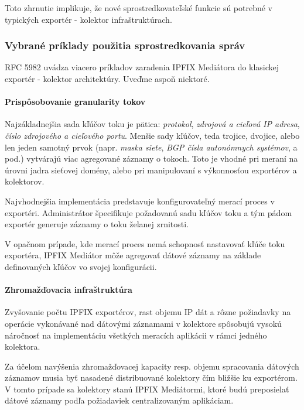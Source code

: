 Toto zhrnutie implikuje, že nové sprostredkovateľské funkcie sú potrebné v typických exportér - kolektor
infraštruktúrach. 

\subsubsection{Vybrané príklady použitia sprostredkovania správ} \label{sec:mediator_examples}

RFC 5982 \citep{rfc5982} uvádza viacero príkladov zaradenia IPFIX Mediátora do klasickej
exportér - kolektor architektúry. Uveďme aspoň niektoré.

\paragraph{Prispôsobovanie granularity tokov}

Najzákladnejšia sada kľúčov toku je pätica: \emph{protokol}, \emph{zdrojová a cieľová IP adresa}, 
\emph{číslo zdrojového a cieľového portu}. Menšie sady kľúčov, teda trojice, dvojice, alebo len jeden 
samotný prvok (napr. \emph{maska siete}, \emph{BGP čísla autonómnych systémov}, a pod.) vytvárajú viac 
agregované záznamy o tokoch. Toto je vhodné pri meraní na úrovni 
jadra sieťovej domény, alebo pri manipulovaní s výkonnosťou exportérov a kolektorov.

Najvhodnejšia implementácia predstavuje konfigurovateľný merací proces v exportéri. Administrátor 
špecifikuje požadovanú sadu kľúčov toku a tým pádom exportér generuje záznamy o toku želanej zrnitosti.

V opačnom prípade, kde merací proces nemá schopnosť nastavovať kľúče toku exportéra, IPFIX Mediátor 
môže agregovať dátové záznamy na základe definovaných kľúčov vo svojej konfigurácii.

\paragraph{Zhromažďovacia infraštruktúra}

Zvyšovanie počtu IPFIX exportérov, rast objemu IP dát a rôzne požiadavky na operácie vykonávané nad 
dátovými záznamami v kolektore spôsobujú vysokú náročnosť na implementáciu všetkých meracích
aplikácii v rámci jedného kolektora.

Za účelom navýšenia zhromažďovacej kapacity resp. objemu spracovania dátových záznamov musia byť 
nasadené distribuované kolektory čím bližšie ku exportérom. V tomto prípade sa kolektory stanú 
IPFIX Mediátormi, ktoré budú preposielať dátové záznamy podľa požiadaviek centralizovaným aplikáciam.


